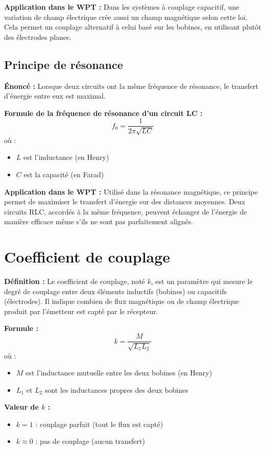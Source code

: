 \documentclass[12pt,a4paper,titlepage,notitlepage]{article}
\begin{document}
	\textbf{Application dans le WPT :} Dans les systèmes à couplage capacitif, une variation de champ électrique crée aussi un champ magnétique selon cette loi. Cela permet un couplage alternatif à celui basé sur les bobines, en utilisant plutôt des électrodes planes.
	
	\subsection{Principe de résonance}
	\textbf{Énoncé :} Lorsque deux circuits ont la même fréquence de résonance, le transfert d’énergie entre eux est maximal.
	
	\textbf{Formule de la fréquence de résonance d’un circuit LC :}
	\[
	f_0 = \frac{1}{2\pi\sqrt{LC}}
	\]
	où :
	\begin{itemize}
		\item \(L\) est l’inductance (en Henry)
		\item \(C\) est la capacité (en Farad)
	\end{itemize}
	
	\textbf{Application dans le WPT :} Utilisé dans la résonance magnétique, ce principe permet de maximiser le transfert d’énergie sur des distances moyennes. Deux circuits RLC, accordés à la même fréquence, peuvent échanger de l’énergie de manière efficace même s’ils ne sont pas parfaitement alignés.
	
	\section{Coefficient de couplage}
	\textbf{Définition :} Le coefficient de couplage, noté \(k\), est un paramètre qui mesure le degré de couplage entre deux éléments inductifs (bobines) ou capacitifs (électrodes). Il indique combien de flux magnétique ou de champ électrique produit par l’émetteur est capté par le récepteur.
	
	\textbf{Formule :}
	\[
	k = \frac{M}{\sqrt{L_1 L_2}}
	\]
	où :
	\begin{itemize}
		\item \(M\) est l’inductance mutuelle entre les deux bobines (en Henry)
		\item \(L_1\) et \(L_2\) sont les inductances propres des deux bobines
	\end{itemize}
	
	\textbf{Valeur de \(k\) :}
	\begin{itemize}
		\item \(k = 1\) : couplage parfait (tout le flux est capté)
		\item \(k \approx 0\) : pas de couplage (aucun transfert)
	\end{itemize}
	
\end{document}
